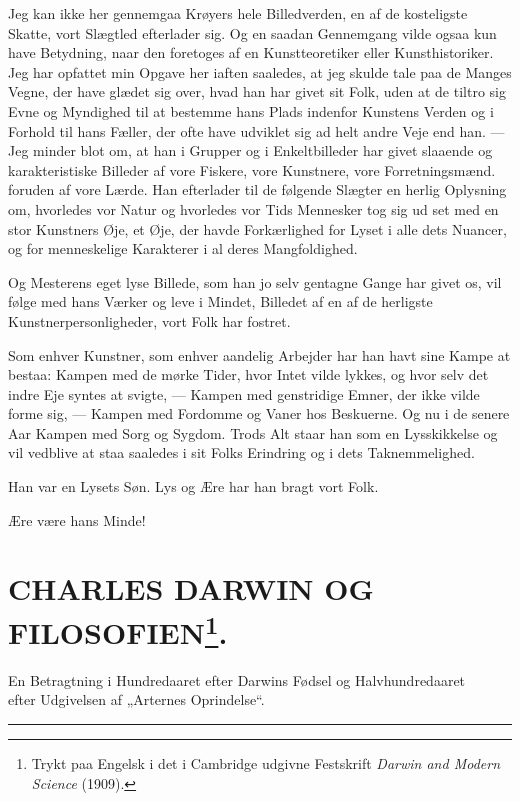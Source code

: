 \documentclass[12pt,a4paper,openany]{book}
\newcommand{\opage}[1]{\marginnote{\footnotesize\textit{[#1]}}}
\newcommand{\essay}[2][]{\chapter*{#2}\addcontentsline{toc}{chapter}{#1}}   %
\newcommand{\undertitel}[1]{\begin{center}\small #1\end{center}}   %
\newcommand{\streg}{\begin{center}\rule{3em}{0.4pt}\end{center}}
\begin{document}
\setcounter{footnote}{0}%
\opage{201}Jeg kan ikke her gennemgaa Krøyers hele Billedverden,
en af de kosteligste Skatte, vort Slægtled efterlader sig. Og
en saadan Gennemgang vilde ogsaa kun have Betydning, naar
den foretoges af en Kunstteoretiker eller Kunsthistoriker. Jeg
har opfattet min Opgave her iaften saaledes, at jeg skulde tale
paa de Manges Vegne, der have glædet sig over, hvad han har
givet sit Folk, uden at de tiltro sig Evne og Myndighed til at
bestemme hans Plads indenfor Kunstens Verden og i Forhold
til hans Fæller, der ofte have udviklet sig ad helt andre Veje
end han. --- Jeg minder blot om, at han i Grupper og i Enkeltbilleder
har givet slaaende og karakteristiske Billeder af
vore Fiskere, vore Kunstnere, vore Forretningsmænd. foruden
af vore Lærde. Han efterlader til de følgende Slægter en
herlig Oplysning om, hvorledes vor Natur og hvorledes vor
Tids Mennesker tog sig ud set med en stor Kunstners Øje, et
Øje, der havde Forkærlighed for Lyset i alle dets Nuancer, og
for menneskelige Karakterer i al deres Mangfoldighed.

Og Mesterens eget lyse Billede, som han jo selv gentagne
Gange har givet os, vil følge med hans Værker og leve i
Mindet, Billedet af en af de herligste Kunstnerpersonligheder,
vort Folk har fostret.

Som enhver Kunstner, som enhver aandelig Arbejder har
han havt sine Kampe at bestaa: Kampen med de mørke Tider,
hvor Intet vilde lykkes, og hvor selv det indre Eje syntes at
svigte, --- Kampen med genstridige Emner, der ikke vilde forme
sig, --- Kampen med Fordomme og Vaner hos Beskuerne. Og
nu i de senere Aar Kampen med Sorg og Sygdom. Trods Alt
staar han som en Lysskikkelse og vil vedblive at staa saaledes
i sit Folks Erindring og i dets Taknemmelighed.

Han var en Lysets Søn. Lys og Ære har han bragt vort
Folk.

Ære være hans Minde!

\setcounter{footnote}{0}%
\opage{202}\essay[Darwin og Filosofien (1909)]{CHARLES DARWIN OG FILOSOFIEN\footnote[1]{Trykt paa Engelsk i det i Cambridge udgivne Festskrift \textit{Darwin and Modern Science} (1909).}.}
\undertitel{En Betragtning i Hundredaaret efter Darwins Fødsel og Halvhundredaaret\\ efter Udgivelsen af „Arternes Oprindelse“.}
\streg
\end{document}
